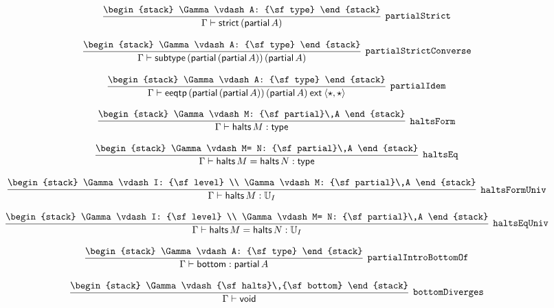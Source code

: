 \[
\infer[{\tt partialStrict}]{\Gamma \vdash {\sf strict}\,({\sf partial}\,A)}{
\begin{stack}
\Gamma \vdash A: {\sf type}
\end{stack}}
\]

\[
\infer[{\tt partialStrictConverse}]{\Gamma \vdash {\sf subtype}\,({\sf partial}\,({\sf partial}\,A))\,({\sf partial}\,A)}{
\begin{stack}
\Gamma \vdash A: {\sf type}
\end{stack}}
\]

\[
\infer[{\tt partialIdem}]{\Gamma \vdash {\sf eeqtp}\,({\sf partial}\,({\sf partial}\,A))\,({\sf partial}\,A)\:{\sf ext}\:\langle \star ,\star \rangle }{
\begin{stack}
\Gamma \vdash A: {\sf type}
\end{stack}}
\]

\[
\infer[{\tt haltsForm}]{\Gamma \vdash {\sf halts}\,M: {\sf type}}{
\begin{stack}
\Gamma \vdash M: {\sf partial}\,A
\end{stack}}
\]

\[
\infer[{\tt haltsEq}]{\Gamma \vdash {\sf halts}\,M= {\sf halts}\,N: {\sf type}}{
\begin{stack}
\Gamma \vdash M= N: {\sf partial}\,A
\end{stack}}
\]

\[
\infer[{\tt haltsFormUniv}]{\Gamma \vdash {\sf halts}\,M: {\Bbb U}_{I}}{
\begin{stack}
\Gamma \vdash I: {\sf level}
\\
\Gamma \vdash M: {\sf partial}\,A
\end{stack}}
\]

\[
\infer[{\tt haltsEqUniv}]{\Gamma \vdash {\sf halts}\,M= {\sf halts}\,N: {\Bbb U}_{I}}{
\begin{stack}
\Gamma \vdash I: {\sf level}
\\
\Gamma \vdash M= N: {\sf partial}\,A
\end{stack}}
\]

\[
\infer[{\tt partialIntroBottomOf}]{\Gamma \vdash {\sf bottom}: {\sf partial}\,A}{
\begin{stack}
\Gamma \vdash A: {\sf type}
\end{stack}}
\]

\[
\infer[{\tt bottomDiverges}]{\Gamma \vdash {\sf void}}{
\begin{stack}
\Gamma \vdash {\sf halts}\,{\sf bottom}
\end{stack}}
\]

